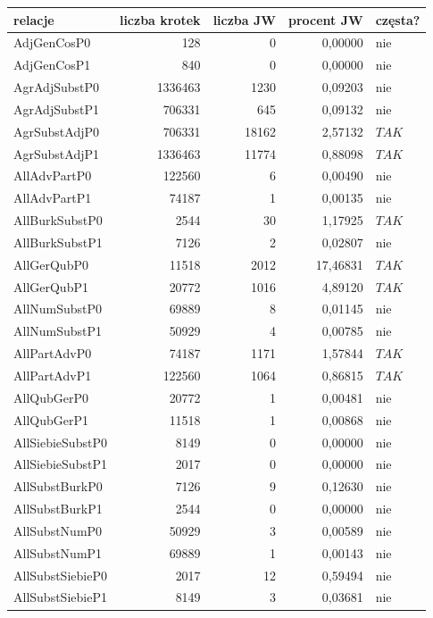 \documentclass[11pt,a4paper]{llncs}
\begin{document}
\begin{table}[h!]
\centering
\footnotesize\setlength{\tabcolsep}{2.5pt}
\begin{tabular}{ l | r | r | r | l }
	\toprule
	\textbf{relacje} 	& \textbf{liczba krotek} & \textbf{liczba JW} & \textbf{procent JW} & \textbf{częsta?} 	\\
	\midrule
	AdjGenCosP0	&	128	&	0	&	0,00000	&	nie	\\
	AdjGenCosP1	&	840	&	0	&	0,00000	&	nie	\\
	AgrAdjSubstP0	&	1336463	&	1230	&	0,09203	&	nie	\\
	AgrAdjSubstP1	&	706331	&	645	&	0,09132	&	nie	\\
	AgrSubstAdjP0	&	706331	&	18162	&	2,57132	&	$ TAK $	\\
	AgrSubstAdjP1	&	1336463	&	11774	&	0,88098	&	$ TAK $	\\
	AllAdvPartP0	&	122560	&	6	&	0,00490	&	nie	\\
	AllAdvPartP1	&	74187	&	1	&	0,00135	&	nie	\\
	AllBurkSubstP0	&	2544	&	30	&	1,17925	&	$ TAK $	\\
	AllBurkSubstP1	&	7126	&	2	&	0,02807	&	nie	\\
	AllGerQubP0	&	11518	&	2012	&	17,46831	&	$ TAK $	\\
	AllGerQubP1	&	20772	&	1016	&	4,89120	&	$ TAK $	\\
	AllNumSubstP0	&	69889	&	8	&	0,01145	&	nie	\\
	AllNumSubstP1	&	50929	&	4	&	0,00785	&	nie	\\
	AllPartAdvP0	&	74187	&	1171	&	1,57844	&	$ TAK $	\\
	AllPartAdvP1	&	122560	&	1064	&	0,86815	&	$ TAK $	\\
	AllQubGerP0	&	20772	&	1	&	0,00481	&	nie	\\
	AllQubGerP1	&	11518	&	1	&	0,00868	&	nie	\\
	AllSiebieSubstP0	&	8149	&	0	&	0,00000	&	nie	\\
	AllSiebieSubstP1	&	2017	&	0	&	0,00000	&	nie	\\
	AllSubstBurkP0	&	7126	&	9	&	0,12630	&	nie	\\
	AllSubstBurkP1	&	2544	&	0	&	0,00000	&	nie	\\
	AllSubstNumP0	&	50929	&	3	&	0,00589	&	nie	\\
	AllSubstNumP1	&	69889	&	1	&	0,00143	&	nie	\\
	AllSubstSiebieP0	&	2017	&	12	&	0,59494	&	nie	\\
	AllSubstSiebieP1	&	8149	&	3	&	0,03681	&	nie	\\

\end{tabular}
\end{table}
\end{document}
